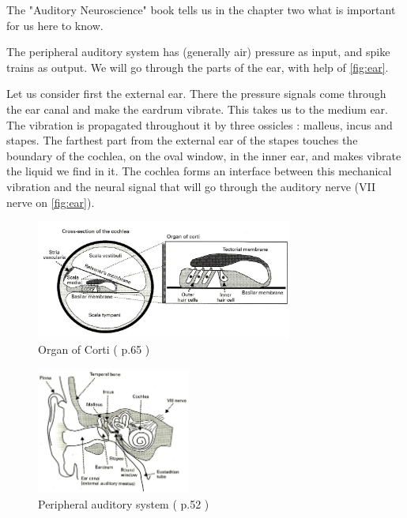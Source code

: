 The "Auditory Neuroscience" book \cite{AuditoryNeuroscience} tells us in the 
chapter two what is important for us here to know. 

The peripheral auditory system has (generally air) pressure as input, 
and spike trains as output. We will go through the parts of the ear, with help 
of \autoref{fig:ear}. 

Let us consider first the external ear. There the pressure signals come through
 the ear canal and make the eardrum vibrate. 
This takes us to the medium ear. 
The vibration is propagated throughout it by three ossicles : malleus, incus 
and stapes. The farthest part from the external ear of the stapes touches the 
boundary of the cochlea, on the oval window, in the inner ear, 
and makes vibrate the liquid we find in it. 
The cochlea forms an interface between this mechanical vibration 
and the neural signal that will go through the auditory nerve 
(VII nerve on \autoref{fig:ear}).

\begin{figure}[ht]
	\centering
  \includegraphics[width=0.75\textwidth]{images/corti2-aud65-level.jpg}
	\caption{Organ of Corti (\cite{AuditoryNeuroscience} p.65 )}
	\label{fig:corti}
\end{figure}


\begin{figure}[h]
	\centering
	\includegraphics[width=0.45\textwidth]{images/ear2-aud52-level.jpg}
	\caption{Peripheral auditory system (\cite{AuditoryNeuroscience} p.52 )}
	\label{fig:ear}
\end{figure}

